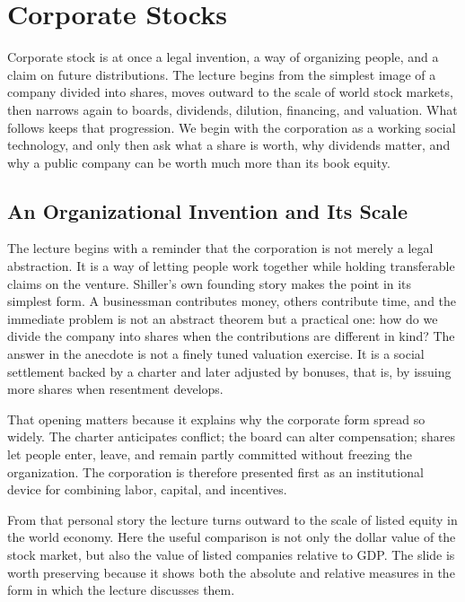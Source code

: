 \chapter{Corporate Stocks}

Corporate stock is at once a legal invention, a way of organizing people, and a claim on future distributions. The lecture begins from the simplest image of a company divided into shares, moves outward to the scale of world stock markets, then narrows again to boards, dividends, dilution, financing, and valuation. What follows keeps that progression. We begin with the corporation as a working social technology, and only then ask what a share is worth, why dividends matter, and why a public company can be worth much more than its book equity.

\section{An Organizational Invention and Its Scale}

The lecture begins with a reminder that the corporation is not merely a legal abstraction. It is a way of letting people work together while holding transferable claims on the venture. Shiller's own founding story makes the point in its simplest form. A businessman contributes money, others contribute time, and the immediate problem is not an abstract theorem but a practical one: how do we divide the company into shares when the contributions are different in kind? The answer in the anecdote is not a finely tuned valuation exercise. It is a social settlement backed by a charter and later adjusted by bonuses, that is, by issuing more shares when resentment develops.

That opening matters because it explains why the corporate form spread so widely. The charter anticipates conflict; the board can alter compensation; shares let people enter, leave, and remain partly committed without freezing the organization. The corporation is therefore presented first as an institutional device for combining labor, capital, and incentives.

From that personal story the lecture turns outward to the scale of listed equity in the world economy. Here the useful comparison is not only the dollar value of the stock market, but also the value of listed companies relative to GDP. The slide is worth preserving because it shows both the absolute and relative measures in the form in which the lecture discusses them.

